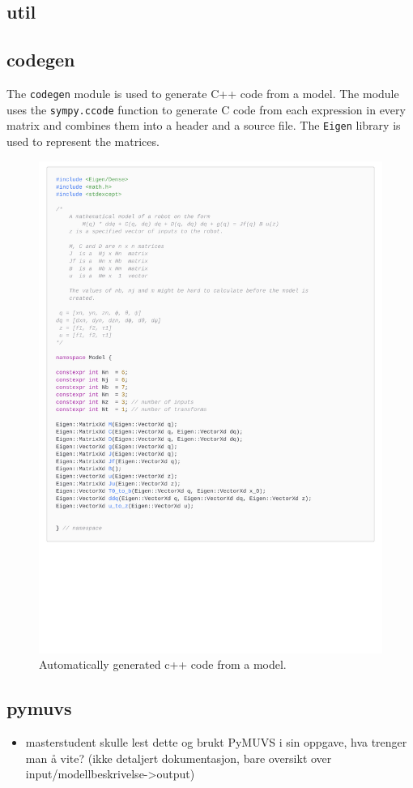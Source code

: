 \subsection{util}


\subsection{codegen}
The \texttt{codegen} module is used to generate C++ code from a model. The module
uses the \texttt{sympy.ccode} function to generate C code from
each expression in every matrix and combines them into a header and a source
file. The \texttt{Eigen} library \cite{eigen3} is used to represent the matrices.

\begin{figure}[h]
    \centering
    \includegraphics[page=1,width=\linewidth,trim=0 9cm 0 0]{assets/codegen.pdf}
    \caption{Automatically generated c++ code from a model.}
    \label{fig:codegen}
\end{figure}

\subsection{pymuvs}

{
    \color{red}
    \begin{itemize}
        \item masterstudent skulle lest dette og brukt PyMUVS i sin oppgave, hva trenger man å vite? (ikke detaljert dokumentasjon, bare oversikt over input/modellbeskrivelse->output)
    \end{itemize}
}
